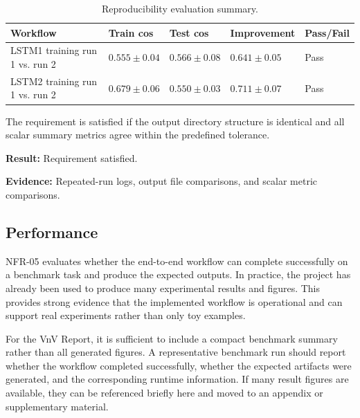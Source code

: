 \documentclass[12pt, titlepage]{article}
\begin{document}
\begin{table}[ht]
\centering
\caption{Reproducibility evaluation summary.}
\label{tab:reproducibility-results}
\begin{tabular}{p{3.1cm} p{2.6cm} p{2.6cm} p{2.8cm} p{2.2cm}}
\toprule
\textbf{Workflow} & \textbf{Train cos} & \textbf{Test cos} & \textbf{Improvement} & \textbf{Pass/Fail} \\
\midrule
LSTM1 training run 1 vs. run 2 &  $0.555 \pm 0.04$ & $0.566 \pm 0.08$ & $0.641 \pm 0.05$ & Pass \\
LSTM2 training run 1 vs. run 2 &  $0.679 \pm 0.06$ & $0.550 \pm 0.03$ & $0.711 \pm 0.07$ & Pass \\
\bottomrule
\end{tabular}
\end{table}

The requirement is satisfied if the output directory structure is identical and all scalar summary metrics agree within the predefined tolerance.

\textbf{Result:} Requirement satisfied.

\textbf{Evidence:} Repeated-run logs, output file comparisons, and scalar metric comparisons.

\subsection{Performance}

NFR-05 evaluates whether the end-to-end workflow can complete successfully on a benchmark task and produce the expected outputs. 
In practice, the project has already been used to produce many experimental results and figures.
This provides strong evidence that the implemented workflow is operational and can support real experiments rather than only toy examples.

For the VnV Report, it is sufficient to include a compact benchmark summary rather than all generated figures.
A representative benchmark run should report whether the workflow completed successfully, whether the expected artifacts were generated, and the corresponding runtime information.
If many result figures are available, they can be referenced briefly here and moved to an appendix or supplementary material.
\end{document}
